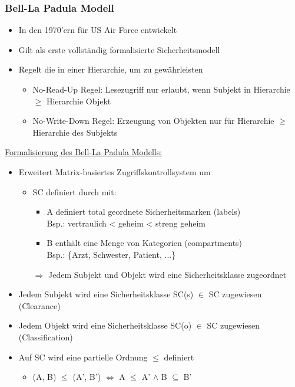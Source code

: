 \subsubsection*{Bell-La Padula Modell}
\begin{itemize}
    \item In den 1970'ern für US Air Force entwickelt
    \item Gilt als erste vollständig formalisierte Sicherheitsmodell
    \item Regelt die  in einer Hierarchie, um  zu gewährleisten
    \begin{itemize}
        \item No-Read-Up Regel: Lesezugriff nur erlaubt, wenn Subjekt in Hierarchie $\geq$ Hierarchie Objekt
        \item No-Write-Down Regel: Erzeugung von Objekten nur für Hierarchie $\geq$ Hierarchie des Subjekts
    \end{itemize}
\end{itemize}
\underline{Formalisierung des Bell-La Padula Modells:}
\begin{itemize}
    \item Erweitert Matrix-basiertes Zugriffskontrollsystem um 
    \begin{itemize}
        \item {} SC definiert durch  mit:
        \begin{itemize}
            \item A definiert total geordnete Sicherheitsmarken (labels)\\
            Bsp.: vertraulich < geheim < streng geheim
            \item B enthält eine Menge von Kategorien (compartments)\\
            Bsp.: \{Arzt, Schwester, Patient, ...\}
        \end{itemize}
        $\Rightarrow$ Jedem Subjekt und Objekt wird eine Sicherheitsklasse zugeordnet
    \end{itemize}
\end{itemize}
\begin{itemize}
    \item Jedem Subjekt wird eine Sicherheitsklasse SC(s) $\in$ SC zugewiesen (Clearance)
    \item Jedem Objekt wird eine Sicherheitsklasse SC(o) $\in$ SC zugewiesen (Classification)
    \item Auf SC wird eine partielle Ordnung $\leq$ definiert
    \begin{itemize}
        \item (A, B) $\leq$ (A', B') $\iff$ A $\leq$ A' $\land$ B $\subseteq$ B'
    \end{itemize}
\end{itemize}
